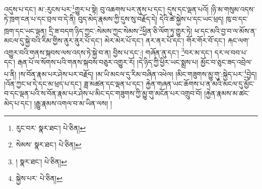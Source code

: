 འདུས་པ་དང་། མ་:རུངས་པར་\footnote{རུང་བར་  སྣར་ཐང་།  པེ་ཅིན། }གྱུར་པ་སྟེ། བུ་འཆགས་པར་ནུས་པ་དང་། དུས་དང་ལྡན་པའོ། །ཉི་མ་གསུམ་འདས་ཏེ་ཁྲག་ངན་པ་དང་བྲལ་བ་དེ་ནི། བུད་མེད་རྣམས་ཀྱི་དུས་སུ་བརྗོད་དེ། དེའི་ཚེ་སྐྱེས་པ་དང་ཡང་ཕྲད། ཁུ་བ་དང་ཁྲག་དང་ཡང་ལྡན། དྲི་ཟ་བདག་ཉིད་ཀྱང་:སེམས་ཀྱང་སེམས་\footnote{སེམས་  སྣར་ཐང་།  པེ་ཅིན། }ཕྱིན་ཅི་ལོག་ཏུ་གྱུར་ཏེ། ཕ་དང་མའི་བྱ་བ་ལ་མོས་ན་མངལ་དུ་སྐྱེ་བའི་རིམ་གྱིས་ནུར་ནུར་པོ་དང་། མེར་མེར་པོ་དང་། ནར་ནར་པོ་དང་། གོར་གོར་བོ་དང་། རྐང་ལག་འགྱུར་བའི་གནས་སྐབས་ལས་འདས་ཏེ་སྐྱེ་བ་ན། བྱིས་པ་དང་:། གཞོན་ནུ་དང་། \footnote{།    སྣར་ཐང་།  པེ་ཅིན། }བར་མ་དང་། དར་ལ་བབ་པ་དང་། རྒན་པོ་ལ་སོགས་པའི་གནས་སྐབས་བཅུར་འགྱུར་རོ། །དེ་ཉིད་ཀྱི་ཕྱིར་ཡང་སྨྲས་པ། མྱོང་བ་ཅུང་ཟད་འབྲེལ་པ་ནི། །ས་བོན་རྣམ་པར་ཤེས་པར་བརྗོད། །མ་ཡི་མངལ་དུ་རིམ་བཞིན་འཕེལ། །མིང་གཟུགས་མྱུ་གུ་:སྐྱེད་པར་\footnote{སྐྱེས་པར་  པེ་ཅིན། }བྱེད། །འོན་ཀྱང་ཕ་དེ་དང་མ་ཕྲད་པ་དང་། ཟླ་མཚན་དང་ལྡན་པ་དང་། རྐྱེན་གཞན་ཡང་ཆོགས་པ་ན་མའི་མངལ་དུ་མྱོང་བ་དང་ལྡན་པའི་ས་བོན་རྣམ་པར་ཤེས་པ་མིང་དང་གཟུགས་ཀྱི་མྱུ་གུ་མངོན་པར་འགྲུབ་བོ། །རྐྱེན་རྣམས་མ་ཚང་མེད་པ་དང་། །རྒྱུ་རྣམས་འགལ་བ་མ་ཡིན་ལས། །

